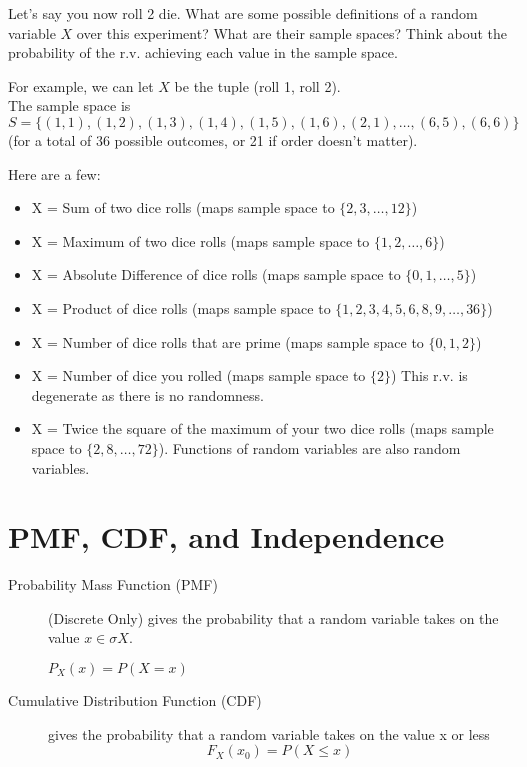 \documentclass[11pt]{article}
\begin{document}
\begin{description}
Let's say you now roll 2 die. What are some possible definitions of a random variable $X$ over this experiment? What are their sample spaces? Think about the probability of the r.v. achieving each value in the sample space.

For example, we can let $X$ be the tuple (roll 1, roll 2). \\
The sample space is $S = \{(1, 1), (1, 2), (1, 3), (1, 4), (1, 5), (1, 6), (2, 1), \dots, (6, 5), (6, 6)\}$ (for a total of 36 possible outcomes, or 21 if order doesn't matter).

\begin{solution}
  \item[Here are a few:]
  \begin{itemize}
    \item X = Sum of two dice rolls (maps sample space to $\{2, 3, \dots, 12\}$)
    \item X = Maximum of two dice rolls (maps sample space to $\{1, 2, \dots, 6\}$)
    \item X = Absolute Difference of dice rolls (maps sample space to $\{0, 1, \dots, 5\}$)
    \item X = Product of dice rolls (maps sample space to $\{1, 2, 3, 4, 5, 6, 8, 9, \dots, 36\}$)
    \item X = Number of dice rolls that are prime (maps sample space to $\{0, 1, 2\}$)
    \item X = Number of dice you rolled (maps sample space to $\{2\}$) This r.v. is degenerate as there is no randomness.
    \item X = Twice the square of the maximum of your two dice rolls (maps sample space to $\{2, 8, \dots, 72\}$). Functions of random variables are also random variables.
  \end{itemize}

\end{solution}
\section*{PMF, CDF, and Independence}
\begin{description}

\item[Probability Mass Function (PMF)] (Discrete Only) gives the probability that a random variable takes on the value $x \in \sigma{X}$.
\begin{center}
$P_X(x) = P(X=x)$
\end{center}


\item[Cumulative Distribution Function (CDF)] gives the probability that a random variable takes on the value x or less
\[F_X(x_0) = P(X \leq x)\]


\end{description}
\end{description}
\end{document}
